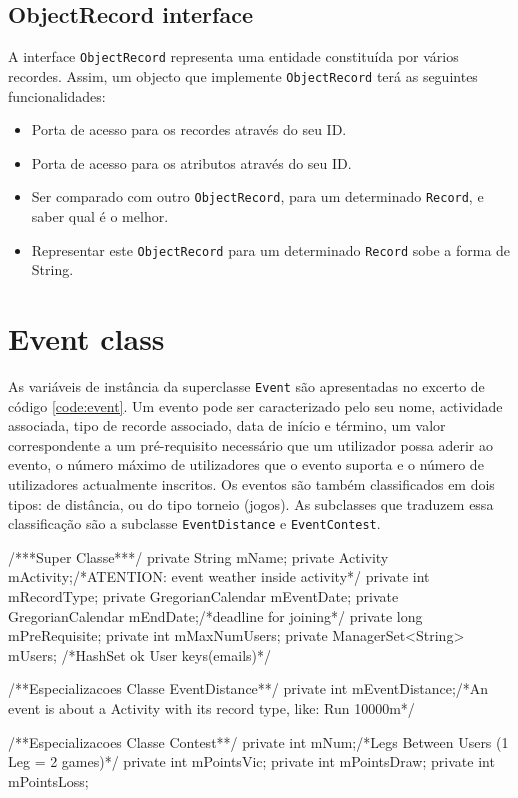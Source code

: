 \documentclass[a4paper,10pt]{report}
\begin{document}
\subsection{ObjectRecord interface}
\label{subsec:objectRecord}
A interface \verb!ObjectRecord! representa uma entidade constituída por vários recordes. 
Assim, um objecto que implemente \verb!ObjectRecord! terá as seguintes funcionalidades:

\begin{itemize}
 \item Porta de acesso para os recordes através do seu ID.
 \item Porta de acesso para os atributos através do seu ID.
 \item Ser comparado com outro \verb!ObjectRecord!, para um determinado \verb!Record!, e saber qual é o melhor.
 \item Representar este \verb!ObjectRecord! para um determinado \verb!Record! sobe a forma de String.
\end{itemize}

\section{Event class}
\label{sec:event}
As variáveis de instância da superclasse \verb!Event! são apresentadas no excerto de código \ref{code:event}.
Um evento pode ser caracterizado pelo seu nome, actividade associada, tipo de recorde associado, 
data de início e término, um valor correspondente a um pré-requisito necessário que um utilizador possa aderir ao evento, 
o número máximo de utilizadores que o evento suporta e o número de utilizadores actualmente inscritos.
Os eventos são também classificados em dois tipos: de distância, ou do tipo torneio (jogos).
As subclasses que traduzem essa classificação são a subclasse \verb!EventDistance! e \verb!EventContest!.

\begin{code}[caption=Variáveis de instância da superclasse Event e subclasses respectivas (src/model/event)., label=code:event]
/***Super Classe***/
private String mName;
private Activity mActivity;/*ATENTION: event weather inside activity*/
private int mRecordType;
private GregorianCalendar mEventDate;
private GregorianCalendar mEndDate;/*deadline for joining*/
private long mPreRequisite;
private int mMaxNumUsers;
private ManagerSet<String> mUsers; /*HashSet ok User keys(emails)*/

/**Especializacoes Classe EventDistance**/
private int mEventDistance;/*An event is about a Activity with its record type, like: Run 10000m*/

/**Especializacoes Classe Contest**/
private int mNum;/*Legs Between Users (1 Leg = 2 games)*/
private int mPointsVic;
private int mPointsDraw;
private int mPointsLoss;
\end{code}
\end{document}
